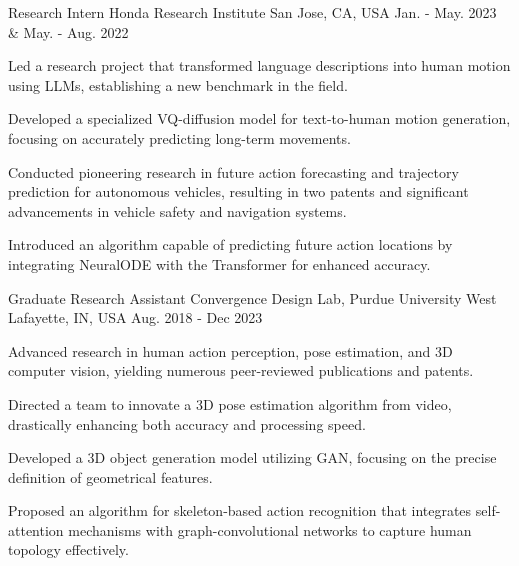 \begin{cventries}
\cventry
{Research Intern} %
{Honda Research Institute} %
{San Jose, CA, USA} %
{Jan. - May. 2023 \& May. - Aug. 2022} %
{ %
\begin{cvitems}
    \item Led a research project that transformed language descriptions into human motion using LLMs, establishing a new benchmark in the field.
    \item Developed a specialized VQ-diffusion model for text-to-human motion generation, focusing on accurately predicting long-term movements.
    \item Conducted pioneering research in future action forecasting and trajectory prediction for autonomous vehicles, resulting in two patents and significant advancements in vehicle safety and navigation systems.
    \item Introduced an algorithm capable of predicting future action locations by integrating NeuralODE with the Transformer for enhanced accuracy.
\end{cvitems}
}

\cventry
{Graduate Research Assistant} %
{Convergence Design Lab, Purdue University} %
{West Lafayette, IN, USA} %
{Aug. 2018 - Dec 2023} %
{ %
\begin{cvitems}
    \item Advanced research in human action perception, pose estimation, and 3D computer vision, yielding numerous peer-reviewed publications and patents.
    \item Directed a team to innovate a 3D pose estimation algorithm from video, drastically enhancing both accuracy and processing speed.
    \item Developed a 3D object generation model utilizing GAN, focusing on the precise definition of geometrical features.
    \item Proposed an algorithm for skeleton-based action recognition that integrates self-attention mechanisms with graph-convolutional networks to capture human topology effectively.
\end{cvitems}
}


\end{cventries}
